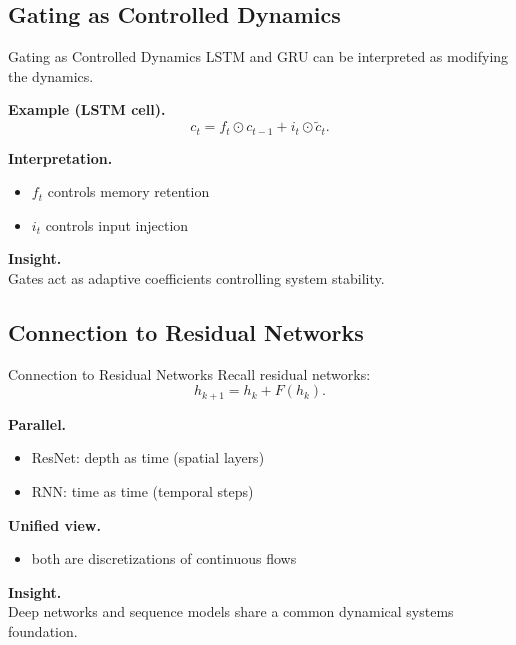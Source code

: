 \documentclass[aspectratio=169,11pt]{beamer}
\begin{document}
\subsection{Gating as Controlled Dynamics}
\begin{frame}[t,allowframebreaks]{Gating as Controlled Dynamics}
\small
LSTM and GRU can be interpreted as modifying the dynamics.

\textbf{Example (LSTM cell).}\\ \[
c_t = f_t \odot c_{t-1} + i_t \odot \tilde{c}_t.
\]

\textbf{Interpretation.}\\ \begin{itemize}
    \item $f_t$ controls memory retention
    \item $i_t$ controls input injection
\end{itemize}

\textbf{Insight.}\\ Gates act as adaptive coefficients controlling system stability.
\end{frame}

\subsection{Connection to Residual Networks}
\begin{frame}[t,allowframebreaks]{Connection to Residual Networks}
\small
Recall residual networks:
\[
h_{k+1} = h_k + F(h_k).
\]

\textbf{Parallel.}\\ \begin{itemize}
    \item ResNet: depth as time (spatial layers)
    \item RNN: time as time (temporal steps)
\end{itemize}

\textbf{Unified view.}\\ \begin{itemize}
    \item both are discretizations of continuous flows
\end{itemize}

\textbf{Insight.}\\ Deep networks and sequence models share a common dynamical systems foundation.
\end{frame}
\end{document}
